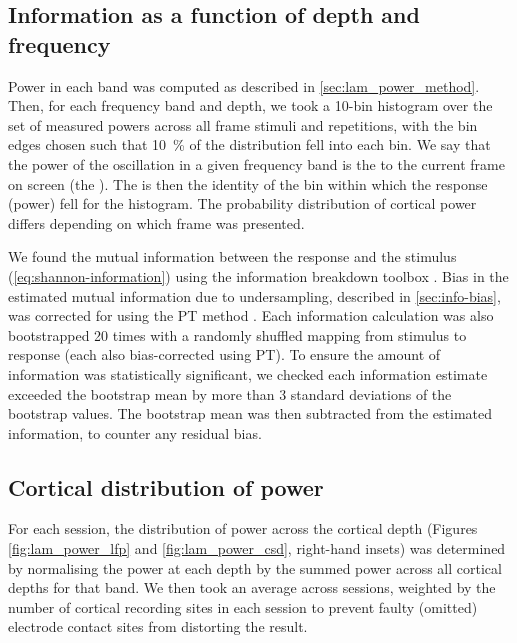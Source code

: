 \subsection{Information as a function of depth and frequency}
\label{sec:lam_info_method}

Power in each band was computed as described in \autoref{sec:lam_power_method}.
Then, for each frequency band and depth, we took a \num{10}-bin histogram over the set of measured powers across all frame stimuli and repetitions, with the bin edges chosen such that \SI{10}{\percent} of the distribution fell into each bin.
We say that the power of the oscillation in a given frequency band is the  to the current frame on screen (the ).
The  is then the identity of the bin within which the response (power) fell for the histogram.
The probability distribution of cortical power differs depending on which frame was presented.

We found the mutual information between the response and the stimulus (\autoref{eq:shannon-information}) using the information breakdown toolbox \citep{Magri2009}.
Bias in the estimated mutual information due to undersampling, described in \autoref{sec:info-bias}, was corrected for using the \ac{PT} method \citep{Treves1995}.
Each information calculation was also bootstrapped \num{20} times with a randomly shuffled mapping from stimulus to response (each also bias-corrected using \ac{PT}).
To ensure the amount of information was statistically significant, we checked each information estimate exceeded the bootstrap mean by more than \num{3} standard deviations of the bootstrap values.
The bootstrap mean was then subtracted from the estimated information, to counter any residual bias.


\subsection{Cortical distribution of power}

For each session, the distribution of power across the cortical depth (Figures \ref{fig:lam_power_lfp} and \ref{fig:lam_power_csd}, right-hand insets) was determined by normalising the power at each depth by the summed power across all cortical depths for that band.
We then took an average across sessions, weighted by the number of cortical recording sites in each session to prevent faulty (omitted) electrode contact sites from distorting the result.


